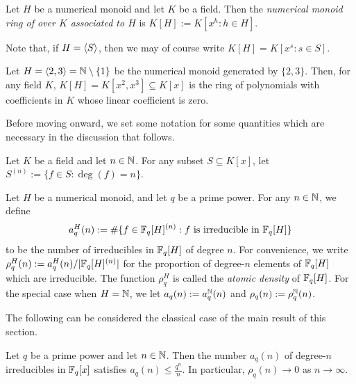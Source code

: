 \begin{defn}
	Let $H$ be a numerical monoid and let $K$ be a field.
	Then the \textit{numerical monoid ring of over $K$ associated to $H$} is $K[H] := K[x^h : h\in H]$.
	
	Note that, if $H = \langle S \rangle$, then we may of course write $K[H] = K[x^s: s\in S]$.
\end{defn}


\begin{eg}
	Let $H = \langle 2,3 \rangle = \mathbb{N} \setminus \{1\}$ be the numerical monoid generated by $\{2,3\}$.
	Then, for any field $K$, $K[H] = K[x^2,x^3] \subseteq K[x]$ is the ring of polynomials with coefficients in $K$ whose linear coefficient is zero.
\end{eg}

Before moving onward, we set some notation for some quantities which are necessary in the discussion that follows.

\begin{defn}
	Let $K$ be a field and let $n\in \mathbb{N}$.
	For any subset $S \subseteq K[x]$, let $S^{(n)} := \{f\in S: \deg(f) = n\}$.
	
	Let $H$ be a numerical monoid, and let $q$ be a prime power.
	For any $n\in \mathbb{N}$, we define 
	\[a_q^H(n) := \#\{f\in \mathbb{F}_q[H]^{(n)}: f \textrm{ is irreducible in } \mathbb{F}_q[H] \}\]
	to be the number of irreducibles in $\mathbb{F}_q[H]$ of degree $n$.
	For convenience, we write $\rho_q^H(n) := a_q^H(n)/|\mathbb{F}_q[H]^{(n)}|$ for the proportion of degree-$n$ elements of $\mathbb{F}_q[H]$ which are irreducible.
	The function $\rho_q^H$ is called the \textit{atomic density} of $\mathbb{F}_q[H]$.
	For the special case when $H = \mathbb{N}$, we let $a_q(n) := a_q^{\mathbb{N}}(n)$ and $\rho_q(n) := \rho_q^{\mathbb{N}}(n)$.
\end{defn}

The following can be considered the classical case of the main result of this section.

\begin{prop}\label{prop:atoms in Fqx}
	Let $q$ be a prime power and let $n\in \mathbb{N}$.
	Then the number $a_q(n)$ of degree-$n$ irreducibles in $\mathbb{F}_q[x]$ satisfies $a_q(n) \le \frac{q^n}{n}$.
	In particular, $\rho_q(n) \to 0$ as $n\to\infty$.
\end{prop}

